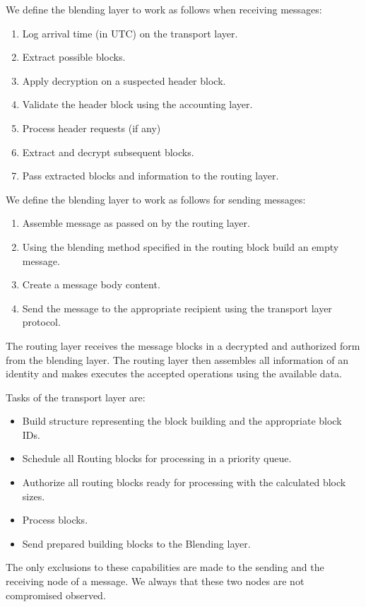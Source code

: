 \documentclass[10pt,journal,compsoc]{IEEEtran}
\begin{document}
We define the blending layer to work as follows when receiving messages:
\begin{enumerate}
	\item Log arrival time (in UTC) on the transport layer.
	\item Extract possible blocks.
	\item Apply decryption on a suspected header block.
	\item Validate the header block using the accounting layer.
	\item Process header requests (if any)
	\item Extract and decrypt subsequent blocks.
	\item Pass extracted blocks and information to the routing layer.
\end{enumerate}

We define the blending layer to work as follows for sending messages:
\begin{enumerate}
	\item Assemble message as passed on by the routing layer.
	\item Using the blending method specified in the routing block build an empty message. 
	\item Create a message body content.
	\item Send the message to the appropriate recipient using the transport layer protocol.
\end{enumerate}

The routing layer receives the message blocks in a decrypted and authorized form from the blending layer. The routing layer then assembles all information of an identity and makes executes the accepted operations using the available data. 

Tasks of the transport layer are:
\begin{itemize}
	\item Build structure representing the block building and the appropriate block IDs.
	\item Schedule all Routing blocks for processing in a priority queue.
	\item Authorize all routing blocks ready for processing with the calculated block sizes.
	\item Process blocks.
	\item Send prepared building blocks to the Blending layer.
\end{itemize}

The only exclusions to these capabilities are made to the sending and the receiving node of a message. We always that these two nodes are not compromised observed.
\end{document}
